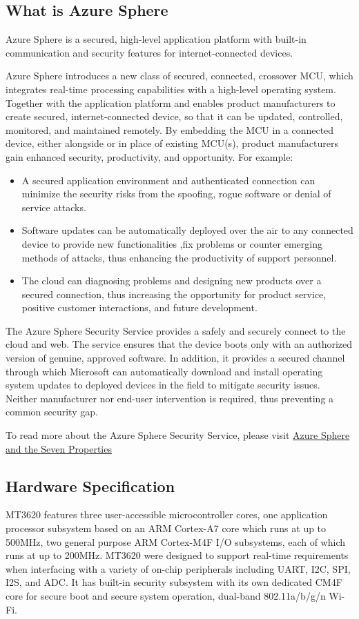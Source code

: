 \subsection{What is Azure Sphere}
Azure Sphere is a secured, high-level application platform with built-in communication and security features for internet-connected devices.

Azure Sphere introduces a new class of secured, connected, crossover MCU, which integrates real-time processing capabilities with a high-level 
operating system. Together with the application platform and enables product manufacturers to create secured, internet-connected device, so that
it can be updated, controlled, monitored, and maintained remotely. By embedding the MCU in a connected device, either alongside or in place of 
existing MCU(s), product manufacturers gain enhanced security, productivity, and opportunity. For example:
\begin{itemize}
    \item A secured application environment and authenticated connection can minimize the security risks from the spoofing, rogue software or denial of 
    service attacks.
    \item Software updates can be automatically deployed over the air to any connected device to provide new functionalities ,fix problems or counter 
    emerging methods of attacks, thus enhancing the productivity of support personnel.
    \item The cloud can diagnosing problems and designing new products over a secured connection, thus increasing the opportunity for product service, 
    positive customer interactions, and future development.
\end{itemize}

The Azure Sphere Security Service provides a safely and securely connect to the cloud and web. The service ensures that the device boots only with an authorized 
version of genuine, approved software. In addition, it provides a secured channel through which Microsoft can automatically download and install operating system 
updates to deployed devices in the field to mitigate security issues. Neither manufacturer nor end-user intervention is required, thus preventing a common security gap.

To read more about the Azure Sphere Security Service, please visit \href{https://docs.microsoft.com/en-us/azure-sphere/product-overview/azure-sphere-seven-properties}{Azure Sphere and the Seven Properties}


 \subsection{Hardware Specification}
 MT3620 features three user-accessible microcontroller cores, one application processor subsystem based on an ARM Cortex-A7 core which runs at up to 500MHz, 
 two general purpose ARM Cortex-M4F I/O subsystems, each of which runs at up to 200MHz. MT3620 were designed to support real-time requirements when interfacing 
 with a variety of on-chip peripherals including UART, I2C, SPI, I2S, and ADC. It has built-in security subsystem with its own dedicated CM4F core for secure 
 boot and secure system operation, dual-band 802.11a/b/g/n Wi-Fi.

